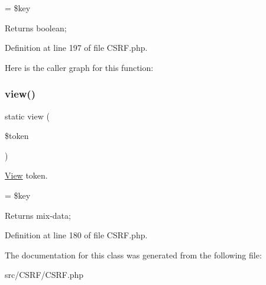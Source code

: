 = \$key

\begin{DoxyReturn}{Returns}
boolean; 
\end{DoxyReturn}


Definition at line 197 of file C\+S\+R\+F.\+php.

Here is the caller graph for this function\+:
\mbox{\label{class_zest_1_1_c_s_r_f_1_1_c_s_r_f_a484a7b8eae4958fe973f16c7ef6051bb}} 
\subsubsection{\texorpdfstring{view()}{view()}}
{\footnotesize\ttfamily static view (\begin{DoxyParamCaption}\item[{}]{\$token }\end{DoxyParamCaption})\hspace{0.3cm}{\ttfamily [static]}}

\mbox{\hyperlink{namespace_zest_1_1_view}{View}} token.

= \$key

\begin{DoxyReturn}{Returns}
mix-\/data; 
\end{DoxyReturn}


Definition at line 180 of file C\+S\+R\+F.\+php.



The documentation for this class was generated from the following file\+:\begin{DoxyCompactItemize}
\item 
src/\+C\+S\+R\+F/C\+S\+R\+F.\+php\end{DoxyCompactItemize}
